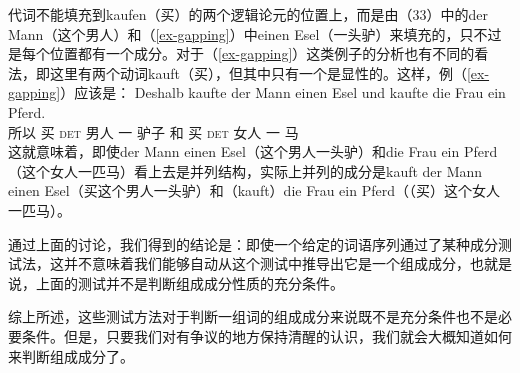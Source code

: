 \eal
{}
\zl
代词不能填充到kaufen（买）的两个逻辑论元的位置上，而是由（33）中的der Mann（这个男人）和（\ref{ex-gapping}）中einen Esel（一头驴）来填充的，只不过是每个位置都有一个成分。对于（\ref{ex-gapping}）这类例子的分析也有不同的看法，即这里有两个动词kauft（买），但其中只有一个是显性的\citep{Crysmann2003c}。这样，例（\ref{ex-gapping}）应该是：
\ea
\gll Deshalb kaufte der Mann einen Esel und kaufte die Frau ein Pferd.\\
	所以 买 \textsc{det} 男人 一 驴子 和 买 \textsc{det} 女人 一 马\\
\z
这就意味着，即使der Mann einen Esel（这个男人一头驴）和die Frau ein Pferd（这个女人一匹马）看上去是并列结构，实际上并列的成分是kauft der Mann einen Esel（买这个男人一头驴）和（kauft）die Frau ein Pferd（（买）这个女人一匹马）。

通过上面的讨论，我们得到的结论是：即使一个给定的词语序列通过了某种成分测试法，这并不意味着我们能够自动从这个测试中推导出它是一个组成成分，也就是说，上面的测试并不是判断组成成分性质的充分条件。

综上所述，这些测试方法对于判断一组词的组成成分来说既不是充分条件也不是必要条件。但是，只要我们对有争议的地方保持清醒的认识，我们就会大概知道如何来判断组成成分了。


